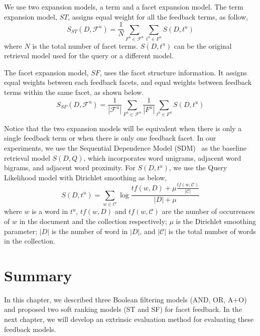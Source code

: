 We use two expansion models, a term and a facet expansion model. The term expansion model, $ST$, assigns equal weight for all the feedback terms, as follow,
\begin{equation}
S_{ST}(D,\mathcal{F}^u) = \frac{1}{N}\sum_{F^u\in\mathcal{F}^u}{\sum_{t^u\in F^u}{S(D,t^u)}}
\end{equation}
where $N$ is the total number of facet terms. $S(D,t^u)$ can be the original retrieval model used for the query or a different model.

The facet expansion model, $SF$, uses the facet structure information. It assigns equal weights between each feedback facets, and equal weights between feedback terms within the same facet, as shown below.
\begin{equation}
S_{SF}(D,\mathcal{F}^u) = \frac{1}{|\mathcal{F}^u|} \sum_{F^u \in \mathcal{F}^u}{ \frac{1}{|F^u|} \sum_{t^u \in F^u}{S(D, t^u)}}
\end{equation}

Notice that the two expansion models will be equivalent when there is only a single feedback term or when there is only one feedback facet. In our experiments, we use the Sequential Dependence Model (SDM)~\cite{metzler2005markov} as the baseline retrieval model $S(D,Q)$, which incorporates word unigrams, adjacent word bigrams, and adjacent word proximity. For $S(D,t^u)$, we use the Query Likelihood model with Dirichlet smoothing as below,
\begin{equation}
S(D,t^u)=\sum_{w\in t^u}{\log\frac{tf(w,D)+\mu\frac{tf(w,\mathcal{C})}{|\mathcal{C}|}}{|D|+\mu}}
\end{equation}
where $w$ is a word in $t^u$, $tf(w,D)$ and $tf(w,\mathcal{C})$ are the number of occurrences of $w$ in the document and the collection respectively; $\mu$ is the Dirichlet smoothing parameter; $|D|$ is the number of word in $|D|$, and $|\mathcal{C}|$ is the total number of words in the collection.

\section{Summary}
In this chapter, we described three Boolean filtering models (AND, OR, A+O) and proposed two soft ranking models (ST and SF) for facet feedback. In the next chapter, we will develop an extrinsic evaluation method for evaluating these feedback models.